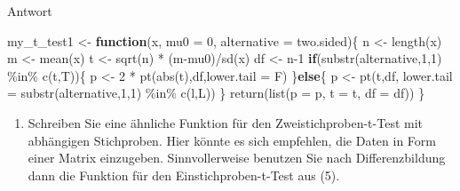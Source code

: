 \documentclass[
]{book}
\newenvironment{Shaded}{\begin{snugshade}}{\end{snugshade}}
\newcommand{\AttributeTok}[1]{\textcolor[rgb]{0.77,0.63,0.00}{#1}}
\newcommand{\ControlFlowTok}[1]{\textcolor[rgb]{0.13,0.29,0.53}{\textbf{#1}}}
\newcommand{\DecValTok}[1]{\textcolor[rgb]{0.00,0.00,0.81}{#1}}
\newcommand{\FunctionTok}[1]{\textcolor[rgb]{0.00,0.00,0.00}{#1}}
\newcommand{\NormalTok}[1]{#1}
\newcommand{\OtherTok}[1]{\textcolor[rgb]{0.56,0.35,0.01}{#1}}
\newcommand{\SpecialCharTok}[1]{\textcolor[rgb]{0.00,0.00,0.00}{#1}}
\newcommand{\StringTok}[1]{\textcolor[rgb]{0.31,0.60,0.02}{#1}}
\providecommand{\tightlist}{%
  \setlength{\itemsep}{0pt}\setlength{\parskip}{0pt}}
\begin{document}
Antwort

\begin{Shaded}
\begin{Highlighting}[]
\NormalTok{my\_t\_test1 }\OtherTok{\textless{}{-}} \ControlFlowTok{function}\NormalTok{(x, }\AttributeTok{mu0 =} \DecValTok{0}\NormalTok{, }\AttributeTok{alternative =} \StringTok{\textquotesingle{}two.sided\textquotesingle{}}\NormalTok{)\{      }
\NormalTok{  n }\OtherTok{\textless{}{-}} \FunctionTok{length}\NormalTok{(x)}
\NormalTok{  m }\OtherTok{\textless{}{-}} \FunctionTok{mean}\NormalTok{(x)}
\NormalTok{  t }\OtherTok{\textless{}{-}} \FunctionTok{sqrt}\NormalTok{(n) }\SpecialCharTok{*}\NormalTok{ (m}\SpecialCharTok{{-}}\NormalTok{mu0)}\SpecialCharTok{/}\FunctionTok{sd}\NormalTok{(x)}
\NormalTok{  df }\OtherTok{\textless{}{-}}\NormalTok{ n}\DecValTok{{-}1}  
  \ControlFlowTok{if}\NormalTok{(}\FunctionTok{substr}\NormalTok{(alternative,}\DecValTok{1}\NormalTok{,}\DecValTok{1}\NormalTok{) }\SpecialCharTok{\%in\%} \FunctionTok{c}\NormalTok{(}\StringTok{\textquotesingle{}t\textquotesingle{}}\NormalTok{,}\StringTok{\textquotesingle{}T\textquotesingle{}}\NormalTok{))\{}
\NormalTok{    p }\OtherTok{\textless{}{-}} \DecValTok{2} \SpecialCharTok{*} \FunctionTok{pt}\NormalTok{(}\FunctionTok{abs}\NormalTok{(t),df,}\AttributeTok{lower.tail =}\NormalTok{ F)}
\NormalTok{  \}}\ControlFlowTok{else}\NormalTok{\{ }
\NormalTok{    p }\OtherTok{\textless{}{-}} \FunctionTok{pt}\NormalTok{(t,df,}
            \AttributeTok{lower.tail =} \FunctionTok{substr}\NormalTok{(alternative,}\DecValTok{1}\NormalTok{,}\DecValTok{1}\NormalTok{) }\SpecialCharTok{\%in\%} \FunctionTok{c}\NormalTok{(}\StringTok{\textquotesingle{}l\textquotesingle{}}\NormalTok{,}\StringTok{\textquotesingle{}L\textquotesingle{}}\NormalTok{))}
\NormalTok{  \}}
  \FunctionTok{return}\NormalTok{(}\FunctionTok{list}\NormalTok{(}\AttributeTok{p =}\NormalTok{ p,}
              \AttributeTok{t =}\NormalTok{ t,}
              \AttributeTok{df =}\NormalTok{ df))                }
\NormalTok{\}}
\end{Highlighting}
\end{Shaded}

\begin{enumerate}
\def\labelenumi{(\arabic{enumi})}
\setcounter{enumi}{5}
\tightlist
\item
  Schreiben Sie eine ähnliche Funktion für den Zweistichproben-t-Test mit abhängigen Stichproben. Hier könnte es sich empfehlen, die Daten in Form einer Matrix einzugeben. Sinnvollerweise benutzen Sie nach Differenzbildung dann die Funktion für den Einstichproben-t-Test aus (5).
\end{enumerate}
\end{document}
